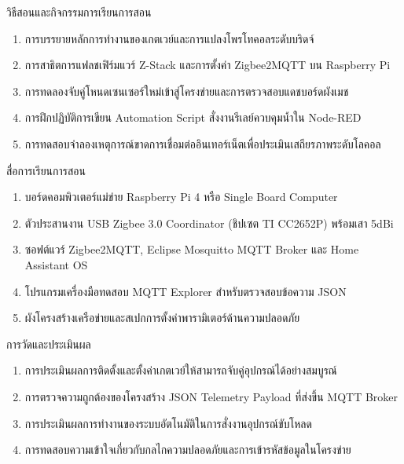 \newpage

\begin{planbox}{วิธีสอนและกิจกรรมการเรียนการสอน}
\begin{enumerate}[topsep=1pt, itemsep=0.5pt, partopsep=0pt, parsep=0pt, leftmargin=1.5em]
    \item การบรรยายหลักการทำงานของเกตเวย์และการแปลงโพรโทคอลระดับบริดจ์
    \item การสาธิตการแฟลชเฟิร์มแวร์ Z-Stack และการตั้งค่า Zigbee2MQTT บน Raspberry Pi
    \item การทดลองจับคู่โหนดเซนเซอร์ใหม่เข้าสู่โครงข่ายและการตรวจสอบแดชบอร์ดผังเมช
    \item การฝึกปฏิบัติการเขียน Automation Script สั่งงานรีเลย์ควบคุมน้ำใน Node-RED
    \item การทดสอบจำลองเหตุการณ์ขาดการเชื่อมต่ออินเทอร์เน็ตเพื่อประเมินเสถียรภาพระดับโลคอล
\end{enumerate}
\end{planbox}

\begin{planbox}{สื่อการเรียนการสอน}
\begin{enumerate}[topsep=1pt, itemsep=0.5pt, partopsep=0pt, parsep=0pt, leftmargin=1.5em]
    \item บอร์ดคอมพิวเตอร์แม่ข่าย Raspberry Pi 4 หรือ Single Board Computer
    \item ตัวประสานงาน USB Zigbee 3.0 Coordinator (ชิปเซต TI CC2652P) พร้อมเสา 5dBi
    \item ซอฟต์แวร์ Zigbee2MQTT, Eclipse Mosquitto MQTT Broker และ Home Assistant OS
    \item โปรแกรมเครื่องมือทดสอบ MQTT Explorer สำหรับตรวจสอบข้อความ JSON
    \item ผังโครงสร้างเครือข่ายและสเปกการตั้งค่าพารามิเตอร์ด้านความปลอดภัย
\end{enumerate}
\end{planbox}

\begin{planbox}{การวัดและประเมินผล}
\begin{enumerate}[topsep=1pt, itemsep=0.5pt, partopsep=0pt, parsep=0pt, leftmargin=1.5em]
    \item การประเมินผลการติดตั้งและตั้งค่าเกตเวย์ให้สามารถจับคู่อุปกรณ์ได้อย่างสมบูรณ์
    \item การตรวจความถูกต้องของโครงสร้าง JSON Telemetry Payload ที่ส่งขึ้น MQTT Broker
    \item การประเมินผลการทำงานของระบบอัตโนมัติในการสั่งงานอุปกรณ์ขับโหลด
    \item การทดสอบความเข้าใจเกี่ยวกับกลไกความปลอดภัยและการเข้ารหัสข้อมูลในโครงข่าย
\end{enumerate}
\end{planbox}

